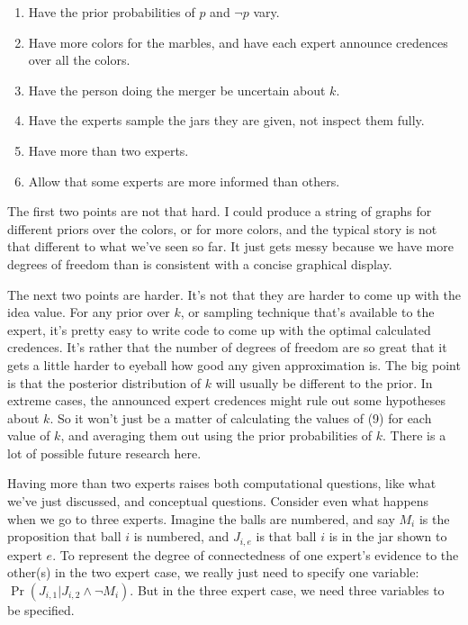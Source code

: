 \documentclass[
  12pt,
]{article}
\providecommand{\tightlist}{%
  \setlength{\itemsep}{0pt}\setlength{\parskip}{0pt}}
\begin{document}
\begin{enumerate}
\def\labelenumi{\arabic{enumi}.}
\tightlist
\item
  Have the prior probabilities of \(p\) and \(\neg p\) vary.
\item
  Have more colors for the marbles, and have each expert announce
  credences over all the colors.
\item
  Have the person doing the merger be uncertain about \(k\).
\item
  Have the experts sample the jars they are given, not inspect them
  fully.
\item
  Have more than two experts.
\item
  Allow that some experts are more informed than others.
\end{enumerate}

The first two points are not that hard. I could produce a string of
graphs for different priors over the colors, or for more colors, and the
typical story is not that different to what we've seen so far. It just
gets messy because we have more degrees of freedom than is consistent
with a concise graphical display.

The next two points are harder. It's not that they are harder to come up
with the idea value. For any prior over \(k\), or sampling technique
that's available to the expert, it's pretty easy to write code to come
up with the optimal calculated credences. It's rather that the number of
degrees of freedom are so great that it gets a little harder to eyeball
how good any given approximation is. The big point is that the posterior
distribution of \(k\) will usually be different to the prior. In extreme
cases, the announced expert credences might rule out some hypotheses
about \(k\). So it won't just be a matter of calculating the values of
(9) for each value of \(k\), and averaging them out using the prior
probabilities of \(k\). There is a lot of possible future research here.

Having more than two experts raises both computational questions, like
what we've just discussed, and conceptual questions. Consider even what
happens when we go to three experts. Imagine the balls are numbered, and
say \(M_i\) is the proposition that ball \(i\) is numbered, and
\(J_{i, e}\) is that ball \(i\) is in the jar shown to expert \(e\). To
represent the degree of connectedness of one expert's evidence to the
other(s) in the two expert case, we really just need to specify one
variable: \(\Pr(J_{i, 1} | J_{i, 2} \wedge \neg M_i)\). But in the three
expert case, we need three variables to be specified.
\end{document}
